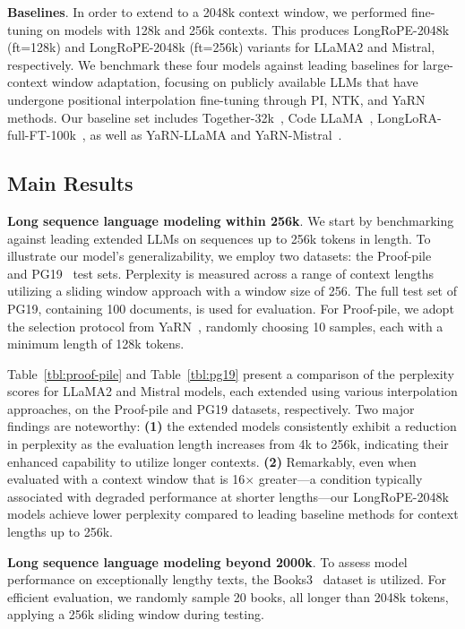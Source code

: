 \textbf{Baselines}. In order to extend to a 2048k context window, we performed fine-tuning on models with 128k and 256k contexts. This produces LongRoPE-2048k (ft=128k) and LongRoPE-2048k (ft=256k) variants for LLaMA2 and Mistral, respectively. We benchmark these four models against leading baselines for large-context window adaptation, focusing on publicly available LLMs that have undergone positional interpolation fine-tuning through PI, NTK, and YaRN methods. Our baseline set includes Together-32k~\cite{together}, Code LLaMA~\cite{codellama}, LongLoRA-full-FT-100k~\cite{longlora}, as well as YaRN-LLaMA and YaRN-Mistral~\cite{yarn}.

\subsection{Main Results}

\label{sec:mainresult}
\textbf{Long sequence language modeling within 256k}. We start by benchmarking against leading extended LLMs on sequences up to 256k tokens in length. To illustrate our model's generalizability, we employ two datasets: the Proof-pile~\cite{pg19} and PG19~\cite{pile} test sets. Perplexity is measured across a range of context lengths utilizing a sliding window approach with a window size of 256. The full test set of PG19, containing 100 documents, is used for evaluation. For Proof-pile, we adopt the selection protocol from YaRN~\cite{yarn}, randomly choosing 10 samples, each with a minimum length of 128k tokens.

Table~\ref{tbl:proof-pile} and Table~\ref{tbl:pg19} present a comparison of the perplexity scores for LLaMA2 and Mistral models, each extended using various interpolation approaches, on the Proof-pile and PG19 datasets, respectively. Two major findings are noteworthy: \textbf{(1)} the extended models consistently exhibit a reduction in perplexity as the evaluation length increases from 4k to 256k, indicating their enhanced capability to utilize longer contexts. \textbf{(2)} Remarkably, even when evaluated with a context window that is 16$\times$ greater—a condition typically associated with degraded performance at shorter lengths—our LongRoPE-2048k models achieve lower perplexity compared to leading baseline methods for context lengths up to 256k.

\textbf{Long sequence language modeling beyond 2000k}. To assess model performance on exceptionally lengthy texts, the Books3~\cite{pile} dataset is utilized. For efficient evaluation, we randomly sample 20 books, all longer than 2048k tokens, applying a 256k sliding window during testing.


